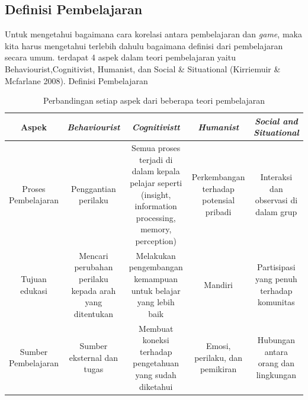 	\subsection{Definisi Pembelajaran}
		Untuk mengetahui bagaimana cara korelasi antara pembelajaran dan \textit{game}, maka kita harus mengetahui terlebih dahulu bagaimana definisi dari pembelajaran secara umum. terdapat 4 aspek dalam teori pembelajaran yaitu Behaviourist,Cognitivist, Humanist, dan Social \& Situational (Kirriemuir \& Mcfarlane 2008).
		\tablename{Definisi Pembelajaran}
		\begin{table}
			\centering
			\caption{Perbandingan setiap aspek dari beberapa teori pembelajaran}
			\label{tab:tab1}
			\begin{tabular}{| c | c | c | c | c |}
				\hline
				Aspek & \textit{Behaviourist} & \textit{Cognitivistt} & \textit{Humanist} & \multicolumn{1}{p{2cm}|}{\textit{Social and Situational}} \\
				\hline
				\multicolumn{1}{|p{2cm}|}{\raggedright Proses Pembelajaran} & \multicolumn{1}{p{2.5cm}|}{\raggedright Penggantian perilaku} & \multicolumn{1}{p{2.5cm}|}{\raggedright Semua proses terjadi di dalam kepala pelajar seperti (insight, information processing, memory, perception)} & \multicolumn{1}{p{2.5cm}|}{\raggedright Perkembangan terhadap potensial pribadi} & \multicolumn{1}{p{2.5cm}|}{\raggedright Interaksi dan observasi di dalam grup} \\
				\hline
				\multicolumn{1}{|p{2cm}|}{Tujuan edukasi} & \multicolumn{1}{p{2.5cm}|}{\raggedright Mencari perubahan perilaku kepada arah yang ditentukan} & \multicolumn{1}{p{2.5cm}|}{\raggedright Melakukan pengembangan kemampuan untuk belajar yang lebih baik} & \multicolumn{1}{p{2.5cm}|}{Mandiri} & \multicolumn{1}{p{2.5cm}|}{\raggedright Partisipasi yang penuh terhadap komunitas} \\
				\hline
				\multicolumn{1}{|p{2cm}|}{Sumber Pembelajaran} & \multicolumn{1}{p{2.5cm}|}{\raggedright Sumber eksternal dan tugas} & \multicolumn{1}{p{2.5cm}|}{\raggedright Membuat koneksi terhadap pengetahuan yang sudah diketahui} & \multicolumn{1}{p{2.5cm}|}{\raggedright Emosi, perilaku, dan pemikiran} & \multicolumn{1}{p{2.5cm}|}{\raggedright Hubungan antara orang dan lingkungan} \\
				\hline
			\end{tabular}
		\end{table}
	

